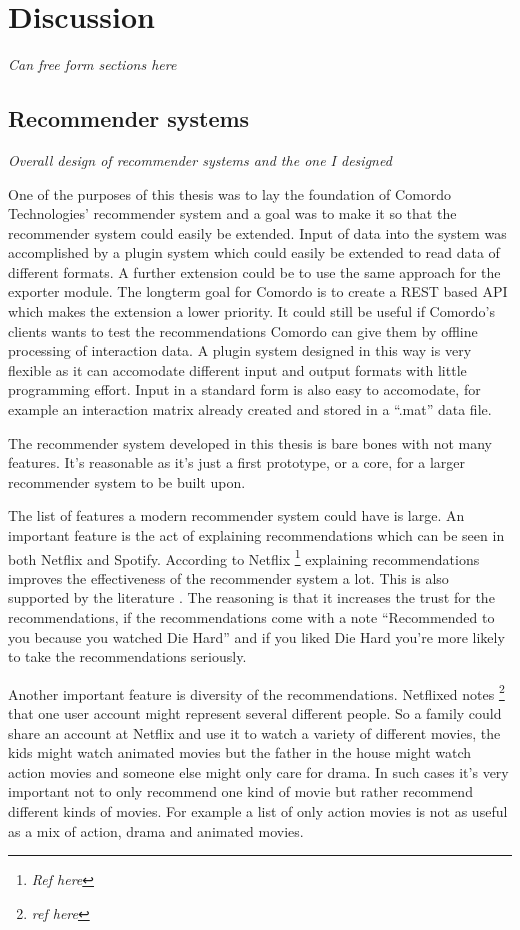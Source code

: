 \chapter{Discussion}\label{cha:discussion}

\textit{Can free form sections here}

\section{Recommender systems}
\textit{Overall design of recommender systems and the one I designed}

One of the purposes of this thesis was to lay the foundation of Comordo Technologies' recommender system and a goal was to make it so that the recommender system could easily be extended. Input of data into the system was accomplished by a plugin system which could easily be extended to read data of different formats. A further extension could be to use the same approach for the exporter module. The longterm goal for Comordo is to create a REST based API which makes the extension a lower priority. It could still be useful if Comordo's clients wants to test the recommendations Comordo can give them by offline processing of interaction data. A plugin system designed in this way is very flexible as it can accomodate different input and output formats with little programming effort. Input in a standard form is also easy to accomodate, for example an interaction matrix already created and stored in a ``.mat'' data file.


The recommender system developed in this thesis is bare bones with not many features. It's reasonable as it's just a first prototype, or a core, for a larger recommender system to be built upon.

The list of features a modern recommender system could have is large. An important feature is the act of explaining recommendations which can be seen in both Netflix and Spotify. According to Netflix
\footnote{\textit{Ref here}}
explaining recommendations improves the effectiveness of the recommender system a lot. This is also supported by the literature
. The reasoning is that it increases the trust for the recommendations, if the recommendations come with a note ``Recommended to you because you watched Die Hard'' and if you liked Die Hard you're more likely to take the recommendations seriously.

Another important feature is diversity of the recommendations. Netflixed notes
\footnote{\textit{ref here}}
that one user account might represent several different people. So a family could share an account at Netflix and use it to watch a variety of different movies, the kids might watch animated movies but the father in the house might watch action movies and someone else might only care for drama. In such cases it's very important not to only recommend one kind of movie but rather recommend different kinds of movies. For example a list of only action movies is not as useful as a mix of action, drama and animated movies.

